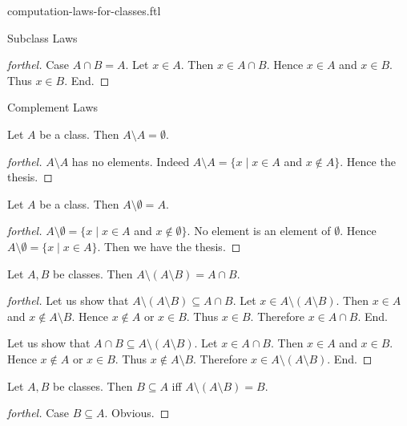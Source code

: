 \documentclass{naproche-library}
\begin{document}
\begin{smodule}[title=Computation Laws For Classes]{computation-laws-for-classes.ftl}
\begin{sfragment}{Subclass Laws}
\begin{proof}[forthel]
    Case $A \cap B = A$.
      Let $x \in A$.
      Then $x \in A \cap B$.
      Hence $x \in A$ and $x \in B$.
      Thus $x \in B$.
    End.
  \end{proof}
\end{sfragment}

\begin{sfragment}{Complement Laws}
  \begin{proposition}[forthel,id=FOUNDATIONS_02_7433299337150464]
    Let $A$ be a class.
    Then $A \setminus A = \emptyset$.
  \end{proposition}
  \begin{proof}[forthel]
    $A \setminus A$ has no elements.
    Indeed $A \setminus A = \{ x \mid x \in A$ and $x \notin A \}$.
    Hence the thesis.
  \end{proof}

  \begin{proposition}[forthel,id=FOUNDATIONS_02_3783696985358336]
    Let $A$ be a class.
    Then $A \setminus \emptyset = A$.
  \end{proposition}
  \begin{proof}[forthel]
    $A \setminus \emptyset = \{ x \mid x \in A$ and $x \notin \emptyset \}$.
    No element is an element of $\emptyset$.
    Hence $A \setminus \emptyset = \{ x \mid x \in A \}$.
    Then we have the thesis.
  \end{proof}

  \begin{proposition}[forthel,id=FOUNDATIONS_02_7083929257377792]
    Let $A, B$ be classes.
    Then $A \setminus (A \setminus B) = A \cap B$.
  \end{proposition}
  \begin{proof}[forthel]
    Let us show that $A \setminus (A \setminus B) \subseteq A \cap B$.
      Let $x \in A \setminus (A \setminus B)$.
      Then $x \in A$ and $x \notin A \setminus B$.
      Hence $x \notin A$ or $x \in B$.
      Thus $x \in B$.
      Therefore $x \in A \cap B$.
    End.

    Let us show that $A \cap B \subseteq A \setminus (A \setminus B)$.
      Let $x \in A \cap B$.
      Then $x \in A$ and $x \in B$.
      Hence $x \notin A$ or $x \in B$.
      Thus $x \notin A \setminus B$.
      Therefore $x \in A \setminus (A \setminus B)$.
    End.
  \end{proof}

  \begin{proposition}[forthel,id=FOUNDATIONS_02_4938646769631232]
    Let $A, B$ be classes.
    Then $B \subseteq A$ iff $A \setminus (A \setminus B) = B$.
  \end{proposition}
  \begin{proof}[forthel]
    Case $B \subseteq A$. Obvious.


\end{proof}
\end{sfragment}
\end{smodule}
\end{document}
